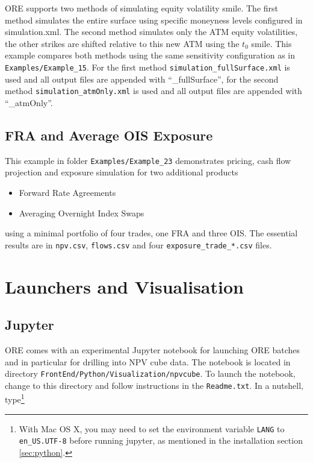 \documentclass[12pt, a4paper]{article}
\begin{document}
\medskip
ORE supports two methods of simulating equity volatility smile. The first method simulates the entire surface using specific moneyness levels configured in simulation.xml. The second method simulates only the ATM equity volatilities, the other strikes are shifted relative to this new ATM using the $t_{0}$ smile.  This example compares both methods using the same sensitivity configuration as in {\tt Examples/Example\_15}. For the first method {\tt simulation\_fullSurface.xml} is used and all output files are appended with ``\_fullSurface'', for the second method {\tt simulation\_atmOnly.xml} is used and all output files are appended with ``\_atmOnly''.


\subsection{FRA and Average OIS Exposure}%

This example in folder {\tt Examples/Example\_23} demonstrates pricing, cash flow projection and exposure simulation for two additional products
\begin{itemize}
\item Forward Rate Agreements
\item Averaging Overnight Index Swaps
\end{itemize}
using a minimal portfolio of four trades, one FRA and three OIS. The essential results are in {\tt npv.csv}, {\tt flows.csv} and 
four {\tt exposure\_trade\_*.csv} files.

\clearpage
\section{Launchers and Visualisation}\label{sec:visualisation}

\subsection{Jupyter}\label{sec:jupyter}

ORE comes with an experimental Jupyter notebook for launching ORE batches and in particular for drilling into NPV cube
data.  The notebook is located in directory {\tt FrontEnd/Python/Visualization/npvcube}. To launch the notebook, change
to this directory and follow instructions in the {\tt Readme.txt}. In a nutshell, type\footnote{With Mac OS X, you may
  need to set the environment variable {\tt LANG} to {\tt en\_US.UTF-8} before running jupyter, as mentioned in the
  installation section \ref{sec:python}.}
\end{document}
